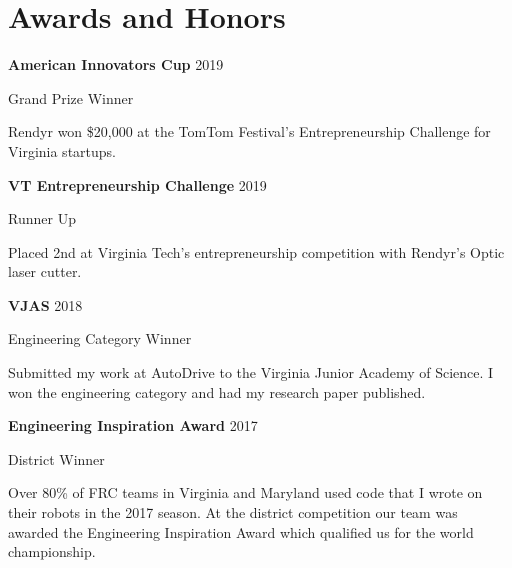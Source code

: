 \section{Awards and Honors}
\begin{small}
\parbox[t][][t]{\linewidth}{
	\parbox{\linewidth}{\textbf{American Innovators Cup} \hfill {{2019}}}
	\parbox{\linewidth}{Grand Prize Winner}
	\smallbreak
	\smallskip
	Rendyr won \$20,000 at the TomTom Festival's Entrepreneurship Challenge for Virginia startups.
	\bigbreak
	\smallskip
}

\parbox[t][][t]{\linewidth}{
	\parbox{\linewidth}{\textbf{VT Entrepreneurship Challenge} \hfill {{2019}}}
	\parbox{\linewidth}{Runner Up}
	\smallbreak
	\smallskip
	Placed 2nd at Virginia Tech's entrepreneurship competition with Rendyr's Optic laser cutter.
	\bigbreak
	\smallskip
}

\parbox[t][][t]{\linewidth}{
	\parbox{\linewidth}{\textbf{VJAS} \hfill {{2018}}}
	\parbox{\linewidth}{Engineering Category Winner}
	\smallbreak
	\smallskip
	Submitted my work at AutoDrive to the Virginia Junior Academy of Science. I won the engineering category and had my research paper published.
	\bigbreak
	\smallskip
}

\parbox[t][][t]{\linewidth}{
	\parbox{\linewidth}{\textbf{Engineering Inspiration Award} \hfill {{2017}}}
	\parbox{\linewidth}{District Winner}
	\smallbreak
	\smallskip
	Over 80\% of FRC teams in Virginia and Maryland used code that I wrote on their robots in the 2017 season. At the district competition our team was awarded the Engineering Inspiration Award which qualified us for the world championship.
	\bigbreak
	\smallskip
}
\end{small}